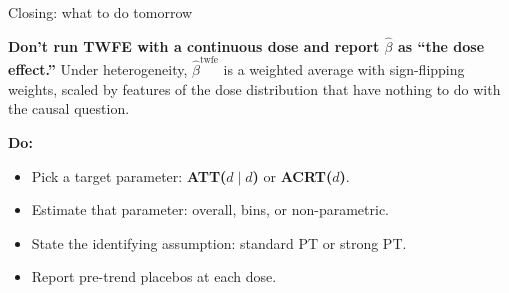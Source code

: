 \documentclass[aspectratio=169,12pt,t]{beamer}
\begin{document}
\begin{frame}{Closing: what to do tomorrow}
\vspace{0.2cm}

\textbf{Don't run TWFE with a continuous dose and report $\widehat\beta$ as ``the dose effect.''} \;Under heterogeneity, $\widehat\beta^{\text{twfe}}$ is a weighted average with sign-flipping weights, scaled by features of the dose distribution that have nothing to do with the causal question.

\vspace{0.4cm}

\textbf{Do:}
\begin{itemize}\small\setlength\itemsep{1pt}
  \item Pick a target parameter: \;\textbf{ATT($d \mid d$)} or \textbf{ACRT($d$)}.
  \item Estimate that parameter: overall, bins, or non-parametric.
  \item State the identifying assumption: standard PT or strong PT.
  \item Report pre-trend placebos at each dose.
\end{itemize}

\vspace{0.4em}
\end{frame}
\end{document}
